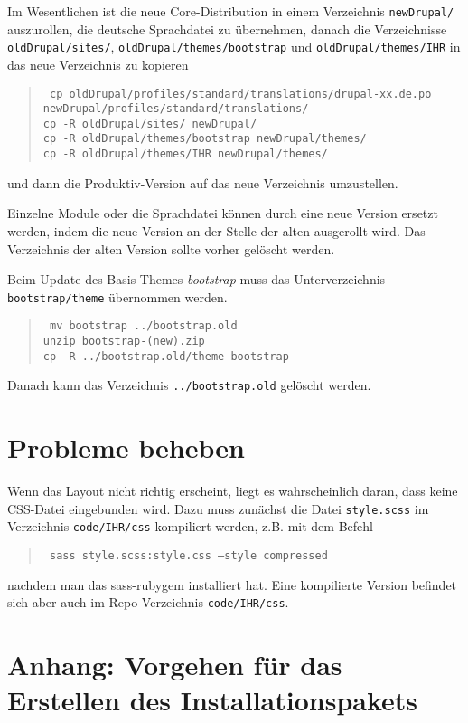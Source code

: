 \documentclass[a4paper,11pt,twoside]{article}
\begin{document}
Im Wesentlichen ist die neue Core-Distribution in einem Verzeichnis
\texttt{newDrupal/} auszurollen, die deutsche Sprachdatei zu übernehmen,
danach die Verzeichnisse \texttt{oldDrupal/sites/},
\texttt{oldDrupal/themes/bootstrap} und \texttt{oldDrupal/themes/IHR} in das
neue Verzeichnis zu kopieren
\begin{quote}\tt
  cp oldDrupal/profiles/standard/translations/drupal-xx.de.po\\\hspace*{2cm} 
  newDrupal/profiles/standard/translations/\\
  cp -R oldDrupal/sites/ newDrupal/\\
  cp -R oldDrupal/themes/bootstrap newDrupal/themes/\\
  cp -R oldDrupal/themes/IHR newDrupal/themes/
\end{quote}
und dann die Produktiv-Version auf das neue Verzeichnis umzustellen. 

Einzelne Module oder die Sprachdatei können durch eine neue Version ersetzt
werden, indem die neue Version an der Stelle der alten ausgerollt wird. Das
Verzeichnis der alten Version sollte vorher gelöscht werden.

Beim Update des Basis-Themes \emph{bootstrap} muss das Unterverzeichnis
\texttt{bootstrap/theme} übernommen werden.
\begin{quote}\tt
  mv bootstrap ../bootstrap.old\\
  unzip bootstrap-(new).zip\\
  cp -R ../bootstrap.old/theme bootstrap
\end{quote}
Danach kann das Verzeichnis \texttt{../bootstrap.old} gelöscht werden.

\section{Probleme beheben}

Wenn das Layout nicht richtig erscheint, liegt es wahrscheinlich daran, dass
keine CSS-Datei eingebunden wird.  Dazu muss zunächst die Datei
\texttt{style.scss} im Verzeichnis \texttt{code/IHR/css} kompiliert werden,
z.B. mit dem Befehl
\begin{quote}\tt
  sass style.scss:style.css --style compressed
\end{quote}
nachdem man das sass-rubygem installiert hat. Eine kompilierte Version befindet
sich aber auch im Repo-Verzeichnis \texttt{code/IHR/css}.

\section{Anhang: Vorgehen für das Erstellen des Installationspakets}
\end{document}
